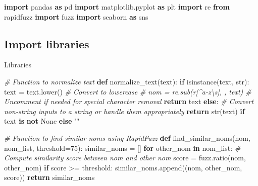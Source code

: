 \documentclass[
]{article}
\author{}
\date{}
\newenvironment{Shaded}{}{}
\newcommand{\BuiltInTok}[1]{\textcolor[rgb]{0.00,0.50,0.00}{#1}}
\newcommand{\CommentTok}[1]{\textcolor[rgb]{0.38,0.63,0.69}{\textit{#1}}}
\newcommand{\ControlFlowTok}[1]{\textcolor[rgb]{0.00,0.44,0.13}{\textbf{#1}}}
\newcommand{\DecValTok}[1]{\textcolor[rgb]{0.25,0.63,0.44}{#1}}
\newcommand{\ImportTok}[1]{\textcolor[rgb]{0.00,0.50,0.00}{\textbf{#1}}}
\newcommand{\KeywordTok}[1]{\textcolor[rgb]{0.00,0.44,0.13}{\textbf{#1}}}
\newcommand{\NormalTok}[1]{#1}
\newcommand{\OperatorTok}[1]{\textcolor[rgb]{0.40,0.40,0.40}{#1}}
\newcommand{\StringTok}[1]{\textcolor[rgb]{0.25,0.44,0.63}{#1}}
\newcommand{\VariableTok}[1]{\textcolor[rgb]{0.10,0.09,0.49}{#1}}
\begin{document}
\hypertarget{a15cdbb8-2313-4372-ba15-e31bcf7fbfc8}{}
\begin{Shaded}
\begin{Highlighting}[]
\ImportTok{import}\NormalTok{ pandas }\ImportTok{as}\NormalTok{ pd}
\ImportTok{import}\NormalTok{ matplotlib.pyplot }\ImportTok{as}\NormalTok{ plt}
\ImportTok{import}\NormalTok{ re}
\ImportTok{from}\NormalTok{ rapidfuzz }\ImportTok{import}\NormalTok{ fuzz}
\ImportTok{import}\NormalTok{ seaborn }\ImportTok{as}\NormalTok{ sns}
\end{Highlighting}
\end{Shaded}

\hypertarget{3f20aca5-0ea2-4e1e-90c8-181cbe10b198}{}
\hypertarget{import-libraries}{%
\subsection{Import libraries}\label{import-libraries}}

\leavevmode{}%
Libraries

\hypertarget{1266435e-fade-4307-8b5d-b4b979e0a898}{}
\begin{Shaded}
\begin{Highlighting}[]
\CommentTok{\# Function to normalize text}
\KeywordTok{def}\NormalTok{ normalize\_text(text):}
    \ControlFlowTok{if} \BuiltInTok{isinstance}\NormalTok{(text, }\BuiltInTok{str}\NormalTok{):}
\NormalTok{        text }\OperatorTok{=}\NormalTok{ text.lower()  }\CommentTok{\# Convert to lowercase}
        \CommentTok{\# nom = re.sub(r\textquotesingle{}[\^{}a{-}z\textbackslash{}s]\textquotesingle{}, \textquotesingle{}\textquotesingle{}, text)  \# Uncomment if needed for special character removal}
        \ControlFlowTok{return}\NormalTok{ text}
    \ControlFlowTok{else}\NormalTok{:}
        \CommentTok{\# Convert non{-}string inputs to a string or handle them appropriately}
        \ControlFlowTok{return} \BuiltInTok{str}\NormalTok{(text) }\ControlFlowTok{if}\NormalTok{ text }\KeywordTok{is} \KeywordTok{not} \VariableTok{None} \ControlFlowTok{else} \StringTok{""}
\end{Highlighting}
\end{Shaded}

\hypertarget{f1a3238c-c344-4dee-a5a0-84e93e515aca}{}
\begin{Shaded}
\begin{Highlighting}[]
\CommentTok{\# Function to find similar noms using RapidFuzz}
\KeywordTok{def}\NormalTok{ find\_similar\_noms(nom, nom\_list, threshold}\OperatorTok{=}\DecValTok{75}\NormalTok{):}
\NormalTok{    similar\_noms }\OperatorTok{=}\NormalTok{ []}
    \ControlFlowTok{for}\NormalTok{ other\_nom }\KeywordTok{in}\NormalTok{ nom\_list:}
        \CommentTok{\# Compute similarity score between nom and other nom}
\NormalTok{        score }\OperatorTok{=}\NormalTok{ fuzz.ratio(nom, other\_nom)}
        \ControlFlowTok{if}\NormalTok{ score }\OperatorTok{\textgreater{}=}\NormalTok{ threshold:}
\NormalTok{            similar\_noms.append((nom, other\_nom, score))}
    \ControlFlowTok{return}\NormalTok{ similar\_noms}
\end{Highlighting}
\end{Shaded}
\end{document}
